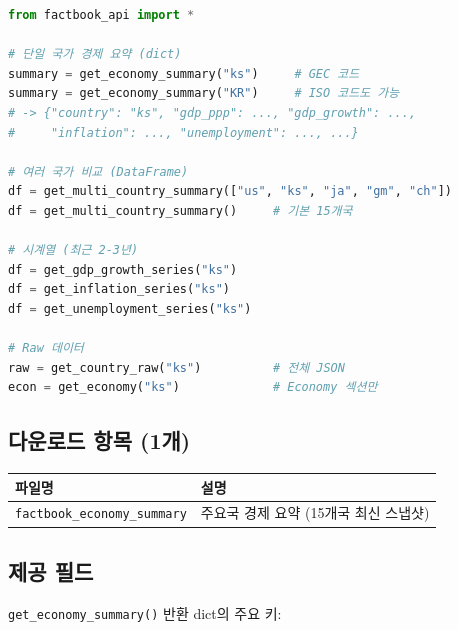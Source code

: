 \documentclass[11pt,a4paper]{article}
\newcommand{\code}[1]{\texttt{#1}}
\newcommand{\file}[1]{\texttt{\textcolor{string}{#1}}}
\begin{document}
\begin{lstlisting}[language=Python]
from factbook_api import *

# 단일 국가 경제 요약 (dict)
summary = get_economy_summary("ks")     # GEC 코드
summary = get_economy_summary("KR")     # ISO 코드도 가능
# -> {"country": "ks", "gdp_ppp": ..., "gdp_growth": ...,
#     "inflation": ..., "unemployment": ..., ...}

# 여러 국가 비교 (DataFrame)
df = get_multi_country_summary(["us", "ks", "ja", "gm", "ch"])
df = get_multi_country_summary()     # 기본 15개국

# 시계열 (최근 2-3년)
df = get_gdp_growth_series("ks")
df = get_inflation_series("ks")
df = get_unemployment_series("ks")

# Raw 데이터
raw = get_country_raw("ks")          # 전체 JSON
econ = get_economy("ks")             # Economy 섹션만
\end{lstlisting}

\subsection{다운로드 항목 (1개)}

\begin{longtable}{l l}
\toprule
\textbf{파일명} & \textbf{설명} \\
\midrule
\file{factbook\_economy\_summary} & 주요국 경제 요약 (15개국 최신 스냅샷) \\
\bottomrule
\end{longtable}

\subsection{제공 필드}

\code{get\_economy\_summary()} 반환 dict의 주요 키:
\end{document}
